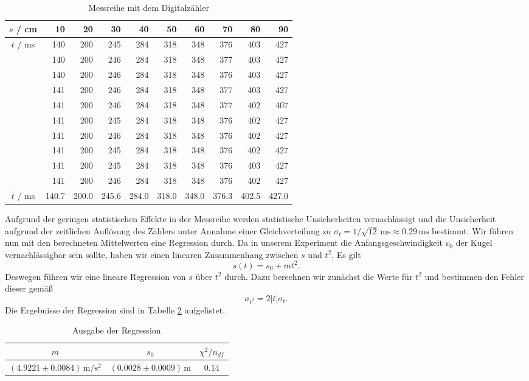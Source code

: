 \documentclass[a4paper, 12pt]{scrartcl}
\begin{document}
\begin{table}[h]
\begin{center}
\begin{tabular}{c|r|r|r|r|r|r|r|r|r}
$s$ / cm & 10 & 20 & 30 & 40 & 50 & 60 & 70 & 80 & 90 \\
\hline
$t$ / ms & 140 & 200 & 245 & 284 & 318 & 348 & 376 & 403 & 427 \\
         & 140 & 200 & 246 & 284 & 318 & 348 & 377 & 403 & 427 \\
	 & 140 & 200 & 246 & 284 & 318 & 348 & 376 & 403 & 427 \\
	 & 141 & 200 & 246 & 284 & 318 & 348 & 377 & 403 & 427 \\
	 & 141 & 200 & 246 & 284 & 318 & 348 & 377 & 402 & 407 \\
	 & 141 & 200 & 245 & 284 & 318 & 348 & 376 & 402 & 427 \\
	 & 141 & 200 & 246 & 284 & 318 & 348 & 376 & 402 & 427 \\
	 & 141 & 200 & 245 & 284 & 318 & 348 & 376 & 402 & 427 \\
	 & 141 & 200 & 245 & 284 & 318 & 348 & 376 & 403 & 427 \\
	 & 141 & 200 & 246 & 284 & 318 & 348 & 376 & 402 & 427 \\
\hline
$\bar t$ / ms & 140.7 & 200.0 & 245.6 & 284.0 & 318.0 & 348.0 & 376.3 & 402.5 & 427.0
\end{tabular}
\caption{Messreihe mit dem Digitalzähler}
\label{tableDz}
\end{center}
\end{table}

Aufgrund der geringen statistischen Effekte in der Messreihe werden statistische Unsicherheiten vernachlässigt und die Unsicherheit aufgrund der zeitlichen Auflösung des Zählers unter Annahme einer Gleichverteilung zu $\sigma_t = 1/\sqrt{12} \, \mathrm{ms} \approx 0.29 \, \mathrm{ms}$ bestimmt. Wir führen nun mit den berechneten Mittelwerten eine Regression durch. Da in unserem Experiment die Anfangsgeschwindigkeit $v_0$ der Kugel vernachlässigbar sein sollte, haben wir einen linearen Zusammenhang zwischen $s$ und $t^2$. Es gilt
$$s(t) = s_0 + mt^2.$$
Deswegen führen wir eine lineare Regression von $s$ über $t^2$ durch. Dazu berechnen wir zunächst die Werte für $t^2$ und bestimmen den Fehler dieser gemäß
$$\sigma_{t^2} = 2|t|\sigma_t.$$
Die Ergebnisse der Regression sind in Tabelle \ref{tableReg1} aufgelistet.

\begin{table}[h!]
\begin{center}
\begin{tabular}{c|c|c}
$m$ & $s_0$ & $\chi^2/n_{df}$ \\
\hline
$(4.9221 \pm 0.0084) \, \mathrm m / \mathrm s^2$ & $(0.0028 \pm 0.0009) \, \mathrm m$ & $0.14$
\end{tabular}
\caption{Ausgabe der Regression}
\label{tableReg1}
\end{center}
\end{table}
\end{document}
